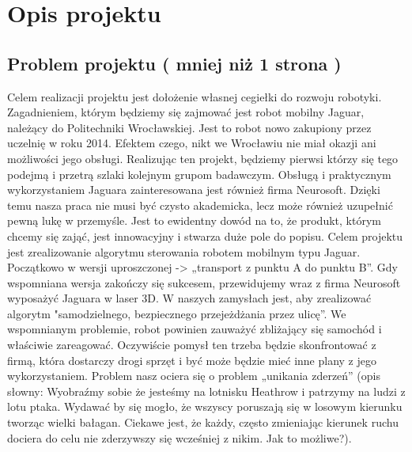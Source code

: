\section{Opis projektu}

\subsection{Problem projektu ( mniej niż 1 strona )}
Celem realizacji projektu jest dołożenie własnej cegiełki do rozwoju robotyki. Zagadnieniem, którym będziemy się zajmować jest robot mobilny Jaguar, należący do Politechniki Wrocławskiej. Jest to robot nowo zakupiony przez uczelnię w roku 2014. Efektem czego, nikt we Wrocławiu nie miał okazji ani możliwości jego obsługi. Realizując ten projekt, będziemy pierwsi którzy się tego podejmą i przetrą szlaki kolejnym grupom badawczym. Obsługą i praktycznym wykorzystaniem Jaguara zainteresowana jest również firma Neurosoft. Dzięki temu nasza praca nie musi być czysto akademicka, lecz może również uzupełnić pewną lukę w przemyśle. Jest to ewidentny dowód na to, że produkt, którym chcemy się zająć, jest innowacyjny i stwarza duże pole do popisu. Celem projektu jest zrealizowanie algorytmu sterowania robotem mobilnym typu Jaguar. Początkowo w wersji uproszczonej -> „transport z punktu A do punktu B”. Gdy wspomniana wersja zakończy się sukcesem, przewidujemy wraz z firma Neurosoft wyposażyć Jaguara w laser 3D. W naszych zamysłach jest, aby zrealizować algorytm "samodzielnego, bezpiecznego przejeżdżania przez ulicę”. We wspomnianym problemie, robot powinien zauważyć zbliżający się samochód i właściwie zareagować. Oczywiście pomysł ten trzeba będzie skonfrontować z firmą, która dostarczy drogi sprzęt i być może będzie mieć inne plany z jego wykorzystaniem. Problem nasz ociera się o problem „unikania zderzeń” (opis słowny: Wyobraźmy sobie że jesteśmy na lotnisku Heathrow i patrzymy na ludzi z lotu ptaka. Wydawać by się mogło, że wszyscy poruszają się w losowym kierunku tworząc wielki bałagan. Ciekawe jest, że każdy, często zmieniając kierunek ruchu dociera do celu nie zderzywszy się wcześniej z nikim. Jak to możliwe?).\newline

